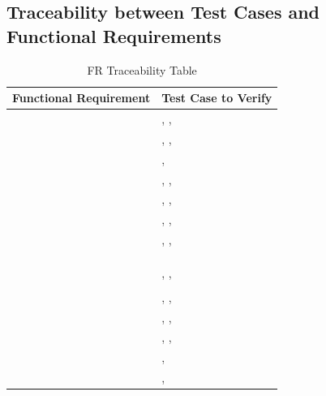 \documentclass[12pt, titlepage]{article}
\begin{document}
\subsection{Traceability between Test Cases and Functional Requirements}
\begin{table}[!h]
\begin{center}
\caption {FR Traceability Table}
\label{tab:FR_Trace}
\begin{tabular}{ | m{8cm} | m{8cm} | } 
\hline
Functional Requirement & Test Case to Verify \\
\hline
\nameref{STA_000} & \nameref{tab:STC_001}, \nameref{tab:STC_002}, \nameref{tab:STC_003} \\ \hline
\nameref{STA_001} & \nameref{tab:STC_001}, \nameref{tab:STC_002}, \nameref{tab:STC_003} \\ \hline
\nameref{STA_002} & \nameref{tab:STC_005}, \nameref{tab:STC_011} \\ \hline
\nameref{STA_003} & \nameref{tab:STC_016}, \nameref{tab:STC_012}, \nameref{tab:STC_013} \\ \hline
\nameref{STA_004} & \nameref{tab:STC_001}, \nameref{tab:STC_002}, \nameref{tab:STC_003} \\ \hline
\nameref{STA_005} & \nameref{tab:STC_001}, \nameref{tab:STC_002}, \nameref{tab:STC_003} \\ \hline
\nameref{STA_006} & \nameref{tab:STC_001}, \nameref{tab:STC_002}, \nameref{tab:STC_003} \\ \hline
\nameref{STA_007} & \nameref{tab:STC_011} \\ \hline
\nameref{STA_008} & \nameref{tab:STC_012} \\ \hline
\nameref{STA_009} & \nameref{tab:STC_006} \\ \hline
\nameref{STA_010} & \nameref{tab:STC_008}, \nameref{tab:STC_009}, \nameref{tab:STC_010} \\ \hline
\nameref{STA_011} & \nameref{tab:STC_012} \\ \hline
\nameref{TRANS_001} & \nameref{tab:STC_001}, \nameref{tab:STC_002}, \nameref{tab:STC_003} \\ \hline
\nameref{TRANS_002} & \nameref{tab:STC_001}, \nameref{tab:STC_002}, \nameref{tab:STC_003} \\ \hline
\nameref{TRANS_003} & \nameref{tab:STC_001}, \nameref{tab:STC_002}, \nameref{tab:STC_003} \\ \hline
\nameref{TRANS_004} & \nameref{tab:STC_013}, \nameref{tab:STC_012} \\ \hline
\nameref{TRANS_005} & \nameref{tab:STC_004}, \nameref{tab:STC_011} \\ \hline

\end{tabular}
\end{center}
\end{table}
\end{document}
